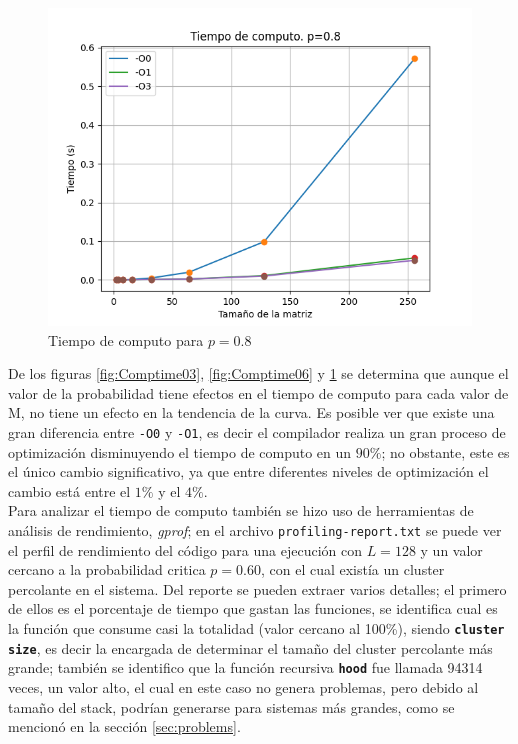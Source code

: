 \documentclass[11pt,twocolumn]{article}
\begin{document}
\begin{figure}
    \includegraphics[width=1\linewidth]{Imagenes/Computing_time_p08.png}
    \caption{Tiempo de computo para $p=0.8$}
    \label{fig:Comptime08}
\end{figure}

\vspace{0.2cm}
De los figuras \ref{fig:Comptime03}, \ref{fig:Comptime06} y \ref{fig:Comptime08} se determina que aunque el valor de la probabilidad tiene efectos en el tiempo de computo para cada valor de M, no tiene un efecto en la tendencia de la curva. Es posible ver que existe una gran diferencia entre \texttt{-O0} y \texttt{-O1}, es decir el compilador realiza un gran proceso de optimización disminuyendo el tiempo de computo en un $90\%$; no obstante, este es el único cambio significativo, ya que entre diferentes niveles de optimización el cambio está entre el $1\%$ y el $4\%$.\\
Para analizar el tiempo de computo también se hizo uso de herramientas de análisis de rendimiento, \textit{gprof}; en el archivo \texttt{profiling-report.txt} se puede ver el perfil de rendimiento del código para una ejecución con $L=128$ y un valor cercano a la probabilidad critica $p=0.60$, con el cual existía un cluster percolante en el sistema. Del reporte se pueden extraer varios detalles; el primero de ellos es el porcentaje de tiempo que gastan las funciones, se identifica cual es la función que consume casi la totalidad (valor cercano al 100\%), siendo \texttt{\textbf{cluster size}}, es decir la encargada de determinar el tamaño del cluster percolante más grande; también se identifico que la función recursiva \texttt{\textbf{hood}} fue llamada 94314 veces, un valor alto, el cual en este caso no genera problemas, pero debido al tamaño del stack, podrían generarse para sistemas más grandes, como se mencionó en la sección \ref{sec:problems}.
\end{document}
